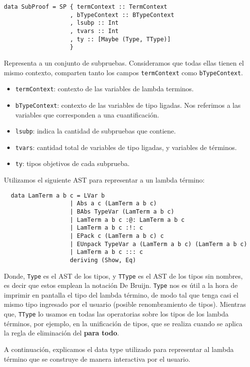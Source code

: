\documentclass[a4paper,11pt]{article}
\theoremstyle{definition}
\begin{document}
\begin{verbatim}
data SubProof = SP { termContext :: TermContext
                   , bTypeContext :: BTypeContext
                   , lsubp :: Int
                   , tvars :: Int
                   , ty :: [Maybe (Type, TType)]
                   }
\end{verbatim}

Representa a un conjunto de subpruebas.
Consideramos que todas ellas tienen el mismo contexto, comparten tanto los campos \texttt{termContext} como \texttt{bTypeContext}.
\begin{itemize}
  \item \texttt{termContext}: contexto de las variables de lambda terminos.
  \item \texttt{bTypeContext}: contexto de las variables de tipo ligadas. Nos referimos a las variables que corresponden a una cuantificación.
  \item \texttt{lsubp}: indica la cantidad de subpruebas que contiene.
  \item \texttt{tvars}: cantidad total de variables de tipo ligadas, y variables de términos.
  \item \texttt{ty}: tipos objetivos de cada subprueba.
\end{itemize}


Utilizamos el siguiente AST para representar a un lambda término:
\begin{verbatim}
  data LamTerm a b c = LVar b
                   | Abs a c (LamTerm a b c)
                   | BAbs TypeVar (LamTerm a b c)
                   | LamTerm a b c :@: LamTerm a b c
                   | LamTerm a b c :!: c
                   | EPack c (LamTerm a b c) c
                   | EUnpack TypeVar a (LamTerm a b c) (LamTerm a b c)
                   | LamTerm a b c ::: c
                   deriving (Show, Eq)
\end{verbatim}
  
Donde, \texttt{Type} es el AST de los tipos, y \texttt{TType} es el AST de los tipos sin nombres, es decir que estos emplean la notación De Bruijn.
\texttt{Type} nos es útil a la hora de imprimir en pantalla el tipo del lambda término, de modo tal que tenga casi el mismo tipo ingresado por el usuario 
(posible renombramiento de tipos).
Mientras que, \texttt{TType} lo usamos en todas las operatorias sobre los tipos de los lambda términos, por ejemplo, en la unificación de tipos, que
se realiza cuando se aplica la regla de eliminación del \textbf{para todo}.

A continuación, explicamos el data type utilizado para representar al lambda término que se construye de manera interactiva por el usuario.
\end{document}
